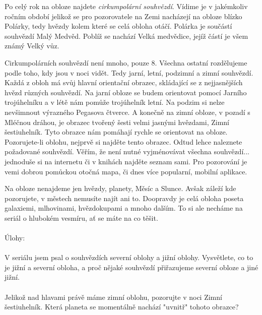 \documentclass[crop=false]{standalone}
\begin{document}
Po celý rok na obloze najdete \textit{cirkumpolární souhvězdí}. 
Vídime je v jakémkoliv ročním období jelikož se pro pozorovatele na Zemi nacházejí na obloze blízko Polárky, tedy hvězdy kolem které se celá obloha otáčí.
Polárka je součástí souhvězdí Malý Medvěd.
Poblíž se nachází Velká medvědice, jejíž částí je všem známý Velký vůz.

Cirkumpolárních souhvězdí není mnoho, pouze 8. Všechna ostatní rozdělujeme podle toho, kdy jsou v noci vidět.
Tedy jarní, letní, podzimní a zimní souhvězdí.
Každá z obloh má svůj hlavní orientační obrazec, skládající se z nejjasnějších hvězd různých souhvězdí.
Na jarní obloze se budem orientovat pomocí Jarního trojúhelníku a v létě nám pomůže trojúhelník letní.
Na podzim si nelze nevšimnout výrazného Pegasova čtverce.
A konečně na zimní obloze, v pozadí s Mléčnou dráhou, je obrazec tvořený šesti velmi jasnými hvězdami, Zimní šestiuhelník.
Tyto obrazce nám pomáhají rychle se orientovat na obloze.
Pozorujete-li oblohu, nejprvě si najděte tento obrazec. Odtud lehce naleznete požadované souhvězdí.
Věřím, že není nutné vyjménovávat všechna souhvězdí... jednoduše si na internetu či v knihách najděte seznam sami.
Pro pozorování je vemi dobrou pomůckou otočná mapa, či dnes více popularní, mobilní aplikace.

Na obloze nenajdeme jen hvězdy, planety, Měsíc a Slunce. Avšak záleží kde pozorujete, v městech nemusíte najít ani to.
Doopravdy je celá obloha poseta galaxiemi, mlhovinami, hvězdokupami a mnoho dalším. 
To si ale necháme na seriál o hlubokém vesmíru, ať se máte na co těšit.
\\
\\
Úlohy: %
\\
\\
V seriálu jsem psal o souhvězdích severní oblohy a jižní oblohy.
Vysvětlete, co to je jižní a severní obloha, a proč nějaké souhvězdí přiřazujeme severní obloze a jiné jižní.
\\
\\
Jelikož nad hlavami právě máme zimní oblohu, pozorujte v noci Zimní šestiuhelník.
Která planeta se momentálně nachází "uvnitř" tohoto obrazce?
\end{document}
